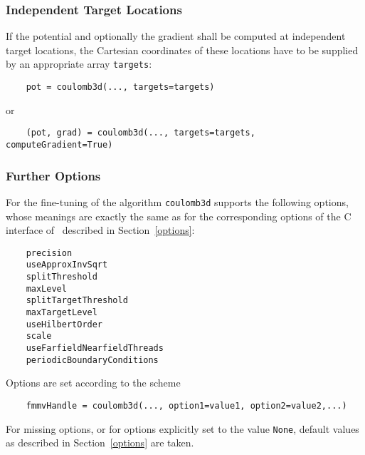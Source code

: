 \subsubsection*{Independent Target Locations}
If the potential and optionally  the gradient shall be computed
at independent target locations, the Cartesian coordinates of these locations 
have to be supplied by an appropriate array \verb|targets|:
\begin{verbatim}
    pot = coulomb3d(..., targets=targets)
\end{verbatim}
or
\begin{verbatim}
    (pot, grad) = coulomb3d(..., targets=targets, computeGradient=True)
\end{verbatim}
\subsubsection*{Further Options}
    For the fine-tuning of the algorithm \verb|coulomb3d| supports
    the following options, whose meanings are exactly the same as  for
    the corresponding options of the C interface of \fmmv\ described in Section~\ref{options}:
\begin{verbatim}
    precision
    useApproxInvSqrt
    splitThreshold
    maxLevel
    splitTargetThreshold
    maxTargetLevel
    useHilbertOrder
    scale
    useFarfieldNearfieldThreads
    periodicBoundaryConditions
\end{verbatim}
Options are set according to the scheme
\begin{verbatim}
    fmmvHandle = coulomb3d(..., option1=value1, option2=value2,...)
\end{verbatim}
For missing options, or for options explicitly set to the value \verb|None|, default values 
as described in Section~\ref{options} 
are taken.
